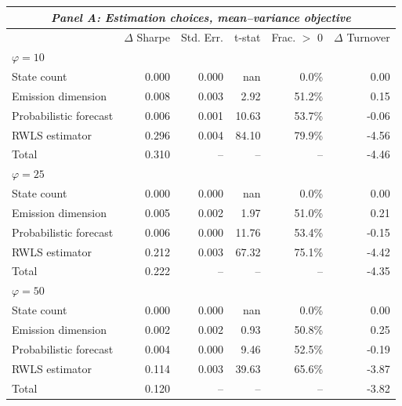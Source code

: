 \begin{tabular*}{\textwidth}{l@{\extracolsep{\fill}}rrrrr}
\toprule
\multicolumn{6}{c}{\textit{Panel A: Estimation choices, mean--variance objective}} \\
\midrule
 & $\Delta$ Sharpe & Std. Err. & t-stat & Frac. $>$ 0 & $\Delta$ Turnover \\
\midrule
\multicolumn{6}{l}{\textit{$\varphi = 10$}} \\
\midrule
State count & 0.000\phantom{$^{***}$} & 0.000 & nan & 0.0\% & 0.00 \\
Emission dimension & 0.008\rlap{$^{***}$}\phantom{$^{***}$} & 0.003 & 2.92 & 51.2\% & 0.15 \\
Probabilistic forecast & 0.006\rlap{$^{***}$}\phantom{$^{***}$} & 0.001 & 10.63 & 53.7\% & -0.06 \\
RWLS estimator & 0.296\rlap{$^{***}$}\phantom{$^{***}$} & 0.004 & 84.10 & 79.9\% & -4.56 \\
Total & 0.310\phantom{$^{***}$} & -- & -- & -- & -4.46 \\
\midrule
\multicolumn{6}{l}{\textit{$\varphi = 25$}} \\
\midrule
State count & 0.000\phantom{$^{***}$} & 0.000 & nan & 0.0\% & 0.00 \\
Emission dimension & 0.005\rlap{$^{**}$}\phantom{$^{***}$} & 0.002 & 1.97 & 51.0\% & 0.21 \\
Probabilistic forecast & 0.006\rlap{$^{***}$}\phantom{$^{***}$} & 0.000 & 11.76 & 53.4\% & -0.15 \\
RWLS estimator & 0.212\rlap{$^{***}$}\phantom{$^{***}$} & 0.003 & 67.32 & 75.1\% & -4.42 \\
Total & 0.222\phantom{$^{***}$} & -- & -- & -- & -4.35 \\
\midrule
\multicolumn{6}{l}{\textit{$\varphi = 50$}} \\
\midrule
State count & 0.000\phantom{$^{***}$} & 0.000 & nan & 0.0\% & 0.00 \\
Emission dimension & 0.002\phantom{$^{***}$} & 0.002 & 0.93 & 50.8\% & 0.25 \\
Probabilistic forecast & 0.004\rlap{$^{***}$}\phantom{$^{***}$} & 0.000 & 9.46 & 52.5\% & -0.19 \\
RWLS estimator & 0.114\rlap{$^{***}$}\phantom{$^{***}$} & 0.003 & 39.63 & 65.6\% & -3.87 \\
Total & 0.120\phantom{$^{***}$} & -- & -- & -- & -3.82 \\
\midrule[\heavyrulewidth]
\end{tabular*}

